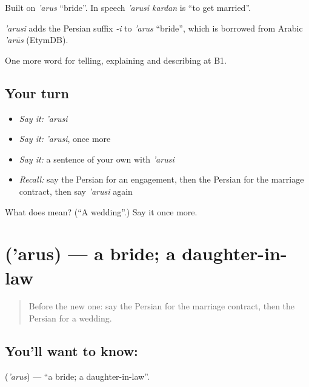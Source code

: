 Built on \emph{'arus} \textquotedblleft{}bride\textquotedblright{}. In speech \emph{'arusi kardan} is \textquotedblleft{}to get married\textquotedblright{}.

\begin{cousinweb}
\emph{'arusi} adds the Persian suffix \emph{-i} to \emph{'arus} \textquotedblleft{}bride\textquotedblright{}, which is borrowed from Arabic \emph{'arūs} (EtymDB).
\end{cousinweb}

\begin{grammarlens}[title={What you've built}]
One more word for telling, explaining and describing at B1.
\end{grammarlens}

\subsection*{Your turn}
\begin{itemize}
\raggedright
  \item \emph{Say it:} \emph{'arusi}
  \item \emph{Say it:} \emph{'arusi}, once more
  \item \emph{Say it:} a sentence of your own with \emph{'arusi}
  \item \emph{Recall:} say the Persian for an engagement, then the Persian for the marriage contract, then say \emph{'arusi} again
\end{itemize}

\begin{tcolorbox}[breakable,colback=teal!4,colframe=teal!35!black,title={Before you move on}]
What does  mean? (\textquotedblleft{}A wedding\textquotedblright{}.) Say it once more.
\end{tcolorbox}
\section[\texorpdfstring{\fa{عروس} ('arus)}{عروس ('arus)}]{ ('arus) — a bride; a daughter-in-law}

\label{lesson:FA-C335-arus}



\begin{quote}
Before the new one: say the Persian for the marriage contract, then the Persian for a wedding.
\end{quote}

\subsection*{You'll want to know: }
\textbf{} (\emph{'arus}) — \textquotedblleft{}a bride; a daughter-in-law\textquotedblright{}.


